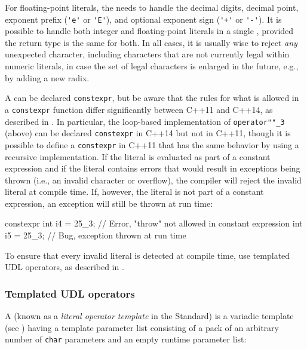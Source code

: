 For floating-point literals, the  needs to
handle the decimal digits, decimal point, exponent prefix (\lstinline!'e'!
or \lstinline!'E'!), and optional exponent sign (\lstinline!'+'! or
\lstinline!'-'!). It is possible to handle both integer and floating-point
literals in a single , provided the return type
is the same for both. In all cases, it is usually wise to reject
\emph{any} unexpected character, including characters that are not
currently legal within numeric literals, in case the set of legal
characters is enlarged in the future, e.g., by adding a new radix.

A  can be declared \lstinline!constexpr!, but be
aware that the rules for what is allowed in a \lstinline!constexpr!
function differ significantly between C++11 and C++14, as described in . In particular, the
loop-based implementation of \lstinline!operator""_3! (above) can be
declared \lstinline!constexpr! in C++14 but not in C++11, though it is
possible to define a \lstinline!constexpr!  in C++11
that has the same behavior by using a recursive implementation. If the
literal is evaluated as part of a constant expression and if the literal
contains errors that would result in exceptions being thrown (i.e., an
invalid character or overflow), the compiler will reject the invalid
literal at compile time. If, however, the literal is not part of a
constant expression, an exception will still be thrown at run time:

\begin{emcppslisting}
constexpr int i4 = 25_3;  // Error, "throw" not allowed in constant expression
          int i5 = 25_3;  // Bug, exception thrown at run time
\end{emcppslisting}
    
\noindent To ensure that every invalid literal is detected at compile time, use
templated UDL operators, as described in .

\subsubsection[Templated UDL operators]{Templated UDL operators}\label{templated-udl-operators}

A  (known as a \emph{literal operator
template} in the Standard) is a variadic template (see ) having a template parameter list
consisting of a pack of an arbitrary number of \lstinline!char! parameters
and an empty runtime parameter list:

